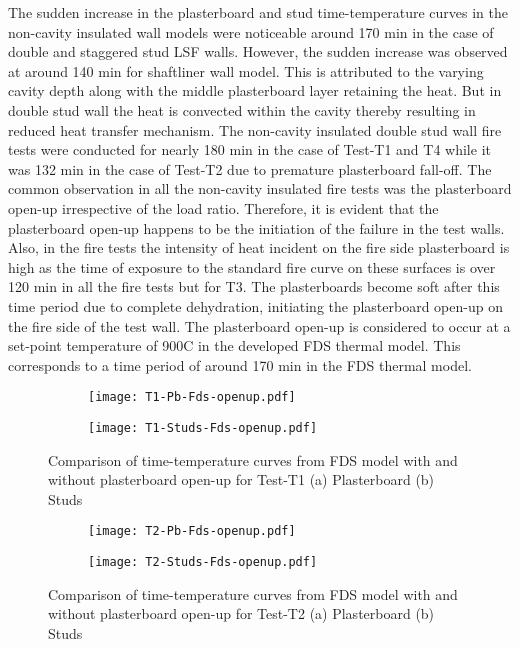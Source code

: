 The sudden increase in the plasterboard and stud time-temperature curves in the non-cavity insulated wall models were noticeable around 170 min in the case of double and staggered stud LSF walls. However, the sudden increase was observed at around 140 min for shaftliner wall model. This is attributed to the varying cavity depth along with the middle plasterboard layer retaining the heat. But in double stud wall the heat is convected within the cavity thereby resulting in reduced heat transfer mechanism. The non-cavity insulated double stud wall fire tests were conducted for nearly 180 min in the case of Test-T1 and T4 while it was 132 min in the case of Test-T2 due to premature plasterboard fall-off. The common observation in all the non-cavity insulated fire tests was the plasterboard open-up irrespective of the load ratio. Therefore, it is evident that the plasterboard open-up happens to be the initiation of the failure in the test walls. Also, in the fire tests the intensity of heat incident on the fire side plasterboard is high as the time of exposure to the standard fire curve on these surfaces is over 120 min in all the fire tests but for T3. The plasterboards become soft after this time period due to complete dehydration, initiating the plasterboard open-up on the fire side of the test wall. The plasterboard open-up is considered to occur at a set-point temperature of 900\degree C in the developed FDS thermal model. This corresponds to a time period of around 170 min in the FDS thermal model.
\begin{figure}[!htbp]
	\centering
	\begin{subfigure}[b]{0.7\textwidth}
		\centering
		\texttt{[image: T1-Pb-Fds-openup.pdf]}
		\caption{}
		\label{subfig:T1-Pb-Fds-openup}
	\end{subfigure}
	\begin{subfigure}[b]{0.6\textwidth}
		\centering
		\texttt{[image: T1-Studs-Fds-openup.pdf]}
		\caption{}
		\label{subfig:T1-Studs-Fds-openup}
	\end{subfigure}
	   \caption{Comparison of time-temperature curves from FDS model with and without plasterboard open-up for Test-T1 (a) Plasterboard (b) Studs}
	   \label{fig:T1-model-comparison-Fds-openup}
\end{figure}
\begin{figure}[!htbp]
	\centering
	\begin{subfigure}[b]{0.7\textwidth}
		\centering
		\texttt{[image: T2-Pb-Fds-openup.pdf]}
		\caption{}
		\label{subfig:T2-Pb-Fds-openup}
	\end{subfigure}
	\begin{subfigure}[b]{0.6\textwidth}
		\centering
		\texttt{[image: T2-Studs-Fds-openup.pdf]}
		\caption{}
		\label{subfig:T2-Studs-Fds-openup}
	\end{subfigure}
	   \caption{Comparison of time-temperature curves from FDS model with and without plasterboard open-up for Test-T2 (a) Plasterboard (b) Studs}
	   \label{fig:T2-model-comparison-Fds-openup}
\end{figure}
